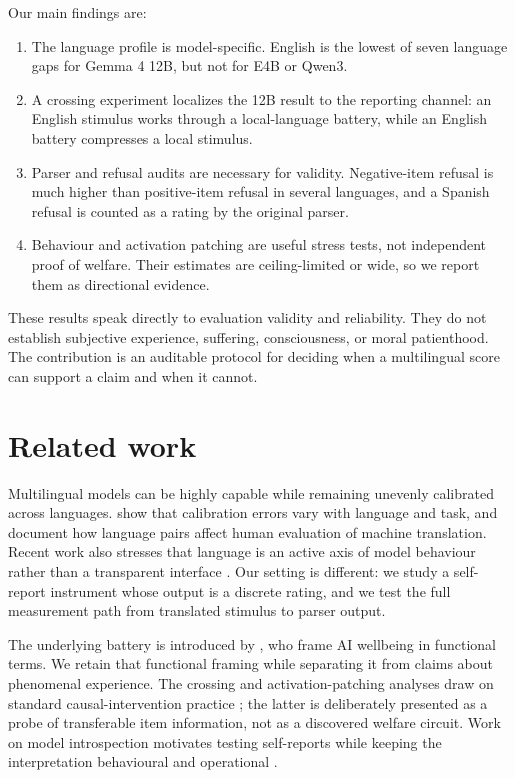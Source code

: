 \documentclass{article}
\begin{document}
Our main findings are:
\begin{enumerate}
    \item The language profile is model-specific. English is the lowest of seven language gaps for Gemma 4 12B, but not for E4B or Qwen3.
    \item A crossing experiment localizes the 12B result to the reporting channel: an English stimulus works through a local-language battery, while an English battery compresses a local stimulus.
    \item Parser and refusal audits are necessary for validity. Negative-item refusal is much higher than positive-item refusal in several languages, and a Spanish refusal is counted as a rating by the original parser.
    \item Behaviour and activation patching are useful stress tests, not independent proof of welfare. Their estimates are ceiling-limited or wide, so we report them as directional evidence.
\end{enumerate}

These results speak directly to evaluation validity and reliability. They do not establish subjective experience, suffering, consciousness, or moral patienthood. The contribution is an auditable protocol for deciding when a multilingual score can support a claim and when it cannot.

\section{Related work}

Multilingual models can be highly capable while remaining unevenly calibrated across languages. \citet{ahuja2022} show that calibration errors vary with language and task, and \citet{licht2022} document how language pairs affect human evaluation of machine translation. Recent work also stresses that language is an active axis of model behaviour rather than a transparent interface \citep{song2025,liu2026}. Our setting is different: we study a self-report instrument whose output is a discrete rating, and we test the full measurement path from translated stimulus to parser output.

The underlying battery is introduced by \citet{ren2026}, who frame AI wellbeing in functional terms. We retain that functional framing while separating it from claims about phenomenal experience. The crossing and activation-patching analyses draw on standard causal-intervention practice \citep{zhang2023}; the latter is deliberately presented as a probe of transferable item information, not as a discovered welfare circuit. Work on model introspection motivates testing self-reports while keeping the interpretation behavioural and operational \citep{binder2024}.
\end{document}
